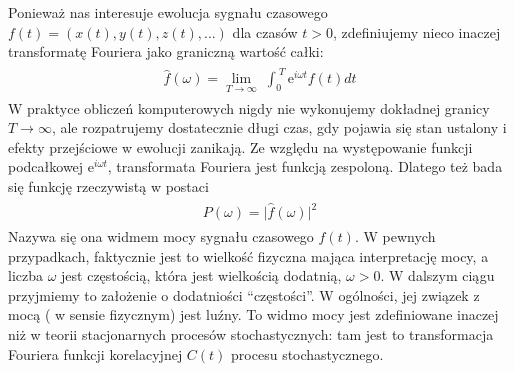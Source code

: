 \documentclass[a4paper,12pt,polish]{sphinxmanual}
\begin{document}
Ponieważ nas interesuje ewolucja sygnału czasowego $f(t) = (x(t),  y(t),  z(t), ...)$ dla czasów $t>0$, zdefiniujemy nieco inaczej transformatę  Fouriera  jako graniczną wartość całki:
\label{ch2/chII012:equation-eqn21}\begin{gather}
\begin{split}{\hat f}(\omega) = \lim_{T\to\infty}  \; \int_{0}^{\; T}  \mbox{e}^{i \omega t} f(t)  dt\end{split}\label{ch2/chII012-eqn21}
\end{gather}
W praktyce obliczeń komputerowych nigdy nie wykonujemy dokładnej granicy $T\to \infty$, ale rozpatrujemy dostatecznie długi czas, gdy pojawia się stan ustalony i efekty przejściowe w ewolucji zanikają.  Ze względu na występowanie funkcji  podcałkowej  $\mbox{e}^{i \omega t}$, transformata Fouriera jest  funkcją  zespoloną. Dlatego też bada się funkcję rzeczywistą w postaci
\label{ch2/chII012:equation-eqn22}\begin{gather}
\begin{split}P(\omega) = \lvert {\hat f}(\omega) \rvert^2\end{split}\label{ch2/chII012-eqn22}
\end{gather}
Nazywa się ona widmem mocy sygnału czasowego $f(t)$. W pewnych przypadkach, faktycznie jest to wielkość fizyczna mająca interpretację mocy, a liczba  $\omega$ jest częstością, która jest wielkością dodatnią, $\omega > 0$.  W dalszym ciągu przyjmiemy to założenie o dodatniości ``częstości''. W ogólności, jej związek z mocą ( w sensie fizycznym) jest luźny. To widmo mocy jest zdefiniowane inaczej niż w teorii stacjonarnych procesów stochastycznych: tam jest to transformacja Fouriera funkcji korelacyjnej $C(t)$  procesu stochastycznego.
\end{document}
